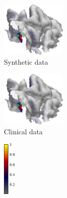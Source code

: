 \documentclass[5p]{elsarticle}
\begin{document}
\begin{figure}[h!]
\begin{footnotesize}
\begin{center}
\begin{minipage}{3.8cm} \begin{center}
\includegraphics[height=2.7cm]{EEG_source_synthetic_data.png} \\ Synthetic data
\end{center}\end{minipage}
\begin{minipage}{3.8cm} \begin{center}
\includegraphics[height=2.7cm]{EEG_source_real_data.png} \\ Clinical data
\end{center}\end{minipage} \begin{minipage}{0.5cm} \begin{center}
\includegraphics[height=2.7cm]{colorbar.png} \\ \null
\end{center}
\end{minipage} 

\end{center}
\end{footnotesize}
\end{figure}
\end{document}
